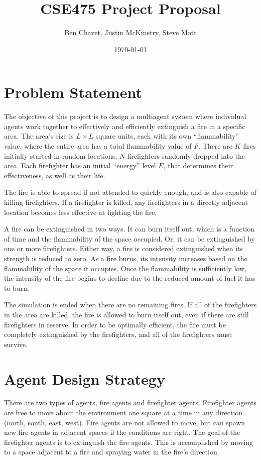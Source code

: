 \documentclass{article}
\title{CSE475 Project Proposal}
\author{Ben Chavet, Justin McKinstry, Steve Mott}
\date{\today}
\begin{document}
\maketitle

\section{Problem Statement}

The objective of this project is to design a multiagent system where
individual agents work together to effectively and efficiently extinguish
a fire in a specific area.  The area's size is $L \times L$ square units,
each with its own ``flammability'' value, where the entire area has a total
flammability value of $F$.  There are $K$ fires initially
started in random locations, $N$ firefighters randomly dropped into
the area.  Each firefighter has an initial ``energy'' level $E$, that
determines their effectiveness, as well as their life.

The fire is able to spread if not attended to quickly enough, and is
also capable of killing firefighters.  If a firefighter is killed, any
firefighters in a directly adjacent location becomes less effective at
fighting the fire.

A fire can be extinguished in two ways.  It can burn itself out, which is a
function of time and the flammability of the space occupied.  Or, it can be
extinguished by one or more firefighters.  Either way, a fire is considered
extinguished when its strength is reduced to zero.  As a fire burns, its
intensity increases based on the flammability of the space it occupies.
Once the flammability is sufficiently low, the intensity of the fire begins
to decline due to the reduced amount of fuel it has to burn.

The simulation is ended when there are no remaining fires.  If all of the
firefighters in the area are killed, the fire is allowed to burn itself out,
even if there are still firefighters in reserve.  In order to be optimally
efficient, the fire must be completely extinguished by the firefighters,
and all of the firefighters must survive.

\section{Agent Design Strategy}

There are two types of agents, fire agents and firefighter agents.  Firefighter
agents are free to move about the environment one square at a time in any
direction (north, south, east, west).  Fire agents are not allowed to move, but
can spawn new fire agents in adjacent spaces if the conditions are right.  The
goal of the firefighter agents is to extinguish the fire agents.  This is
accomplished by moving to a space adjacent to a fire and spraying water in
the fire's direction.
\end{document}
